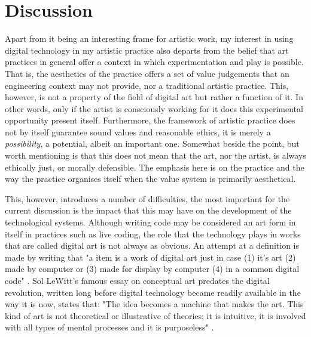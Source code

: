 \documentclass[11pt]{article}
\begin{document}
\section*{Discussion}
\label{sec:org4fc2881}
Apart from it being an interesting frame for artistic work, my
interest in using digital technology in my artistic practice also
departs from the belief that art practices in general offer a context
in which experimentation and play is possible. That is, the aesthetics
of the practice offers a set of value judgements that an engineering
context may not provide, nor a traditional artistic practice. This,
however, is not a property of the field of digital art but rather a
function of it. In other words, only if the artist is consciously
working for it does this experimental opportunity present
itself. Furthermore, the framework of artistic practice does not by
itself guarantee sound values and reasonable ethics, it is merely a
\emph{possibility}, a potential, albeit an important one. Somewhat
beside the point, but worth mentioning is that this does not mean that
the art, nor the artist, is always ethically just, or morally
defensible. The emphasis here is on the practice and the way the
practice organises itself when the value system is primarily
aesthetical.

This, however, introduces a number of difficulties, the most important
for the current discussion is the impact that this may have on the
development of the technological systems. Although writing code may be
considered an art form in itself in practices such as live coding, the
role that the technology plays in works that are called digital art is
not always as obvious. An attempt at a definition is made by
\citeauthor{lopes2009} writing that "a item is a work of digital art
just in case (1) it's art (2) made by computer or (3) made for display
by computer (4) in a common digital code" \citep[p. 3]{lopes2009}. Sol
LeWitt's famous essay on conceptual art predates the digital
revolution, written long before digital technology became readily
available in the way it is now, states that: "The idea becomes a
machine that makes the art. This kind of art is not theoretical or
illustrative of theories; it is intuitive, it is involved with all
types of mental processes and it is purposeless" \citep{Lewitt1967}.
\end{document}
